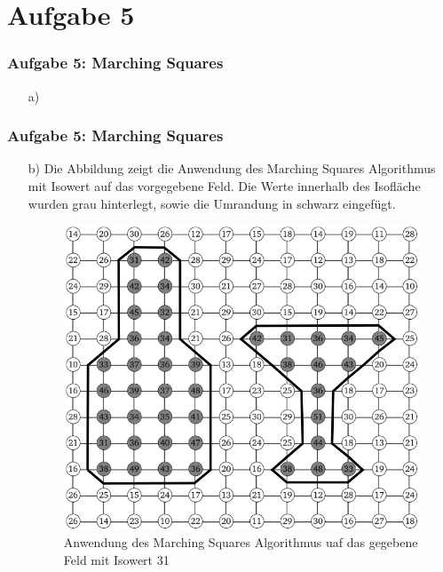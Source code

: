 \documentclass[accentcolor=tud9c,colorbacktitle,inverttitle,landscape,german,presentation,t]{tudbeamer}
\begin{document}
\section{Aufgabe 5}
\begin{frame}
	\frametitle{Aufgabe 5: Marching Squares}
	\begin{itemize}
		\item[a)] %
	\end{itemize}
\end{frame}
\begin{frame}
	\frametitle{Aufgabe 5: Marching Squares}
	\begin{itemize}
		\item[b)] Die Abbildung zeigt die Anwendung des Marching Squares Algorithmus mit Isowert auf das vorgegebene Feld. Die Werte innerhalb des Isofläche wurden grau hinterlegt, sowie die Umrandung in schwarz eingefügt.
		\begin{figure}
			\includegraphics[width = .4\linewidth]{task_5b.png}
			\caption{Anwendung des Marching Squares Algorithmus uaf das gegebene Feld mit Isowert 31}
			\label{MaSq}
		\end{figure}
	\end{itemize}
\end{frame}
\end{document}
